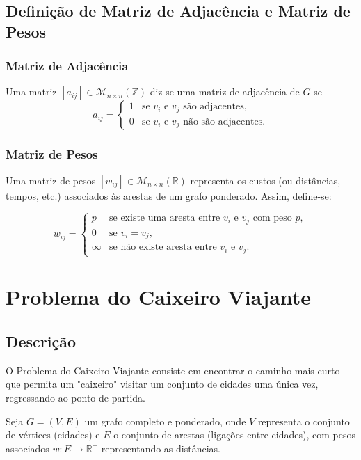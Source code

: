 \documentclass{article}
\begin{document}
\vspace{0.5cm}

\subsection{Definição de Matriz de Adjacência e Matriz de Pesos}
\subsubsection{Matriz de Adjacência}
Uma matriz $[a_{ij}] \in \mathcal{M}_{n \times n}(\mathbb{Z})$ diz-se uma matriz de adjacência de $G$ se
    \[
a_{ij} =
\begin{cases}
1 & \text{se } v_i \text{ e } v_j \text{ são adjacentes}, \\
0 & \text{se } v_i \text{ e } v_j \text{ não são adjacentes}.
\end{cases}
\]

\subsubsection{Matriz de Pesos}
Uma matriz de pesos $[w_{ij}] \in \mathcal{M}_{n \times n}(\mathbb{R})$ representa os custos (ou distâncias, tempos, etc.) associados às arestas de um grafo ponderado. Assim, define-se:

\[
w_{ij} =
\begin{cases}
p & \text{se existe uma aresta entre } v_i \text{ e } v_j \text{ com peso } p, \\
0 & \text{se } v_i = v_j, \\
\infty & \text{se não existe aresta entre } v_i \text{ e } v_j.
\end{cases}
\]

\newpage

\section{Problema do Caixeiro Viajante}
\subsection{Descrição}
O Problema do Caixeiro Viajante consiste em encontrar o caminho mais curto que permita um "caixeiro" visitar um conjunto de cidades uma única vez, regressando ao ponto de partida.

\vspace{0.3cm}

Seja $G = (V, E)$ um grafo completo e ponderado, onde $V$ representa o conjunto de vértices (cidades) e $E$ o conjunto de arestas (ligações entre cidades), com pesos associados $w: E \rightarrow \mathbb{R}^+$ representando as distâncias.
\end{document}
